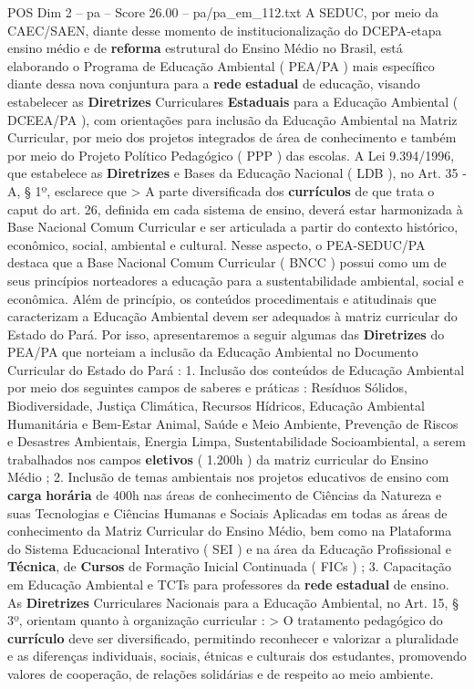 \begin{textsample}{POS Dim 2 – pa – Score 26.00 – pa/pa\_em\_112.txt}
A SEDUC, por meio da CAEC/SAEN, diante desse momento de institucionalização do DCEPA-etapa ensino médio e de \textbf{reforma} estrutural do Ensino Médio no Brasil, está elaborando o Programa de Educação Ambiental ( PEA/PA ) mais específico diante dessa nova conjuntura para a \textbf{rede} \textbf{estadual} de educação, visando estabelecer as \textbf{Diretrizes} Curriculares \textbf{Estaduais} para a Educação Ambiental ( DCEEA/PA ), com orientações para inclusão da Educação Ambiental na Matriz Curricular, por meio dos projetos integrados de área de conhecimento e também por meio do Projeto Político Pedagógico ( PPP ) das escolas.
A Lei 9.394/1996, que estabelece as \textbf{Diretrizes} e Bases da Educação Nacional ( LDB ), no Art. 35 -A, § 1º, esclarece que > A parte diversificada dos \textbf{currículos} de que trata o caput do art. 26, definida em cada sistema de ensino, deverá estar harmonizada à Base Nacional Comum Curricular e ser articulada a partir do contexto histórico, econômico, social, ambiental e cultural.
Nesse aspecto, o PEA-SEDUC/PA destaca que a Base Nacional Comum Curricular ( BNCC ) possui como um de seus princípios norteadores a educação para a sustentabilidade ambiental, social e econômica.
Além de princípio, os conteúdos procedimentais e atitudinais que caracterizam a Educação Ambiental devem ser adequados à matriz curricular do Estado do Pará.
Por isso, apresentaremos a seguir algumas das \textbf{Diretrizes} do PEA/PA que norteiam a inclusão da Educação Ambiental no Documento Curricular do Estado do Pará : 1.
Inclusão dos conteúdos de Educação Ambiental por meio dos seguintes campos de saberes e práticas : Resíduos Sólidos, Biodiversidade, Justiça Climática, Recursos Hídricos, Educação Ambiental Humanitária e Bem-Estar Animal, Saúde e Meio Ambiente, Prevenção de Riscos e Desastres Ambientais, Energia Limpa, Sustentabilidade Socioambiental, a serem trabalhados nos campos \textbf{eletivos} ( 1.200h ) da matriz curricular do Ensino Médio ; 2.
Inclusão de temas ambientais nos projetos educativos de ensino com \textbf{carga} \textbf{horária} de 400h nas áreas de conhecimento de Ciências da Natureza e suas Tecnologias e Ciências Humanas e Sociais Aplicadas em todas as áreas de conhecimento da Matriz Curricular do Ensino Médio, bem como na Plataforma do Sistema Educacional Interativo ( SEI ) e na área da Educação Profissional e \textbf{Técnica}, de \textbf{Cursos} de Formação Inicial Continuada ( FICs ) ; 3.
Capacitação em Educação Ambiental e TCTs para professores da \textbf{rede} \textbf{estadual} de ensino.
As \textbf{Diretrizes} Curriculares Nacionais para a Educação Ambiental, no Art. 15, § 3º, orientam quanto à organização curricular : > O tratamento pedagógico do \textbf{currículo} deve ser diversificado, permitindo reconhecer e valorizar a pluralidade e as diferenças individuais, sociais, étnicas e culturais dos estudantes, promovendo valores de cooperação, de relações solidárias e de respeito ao meio ambiente.

\end{textsample}
